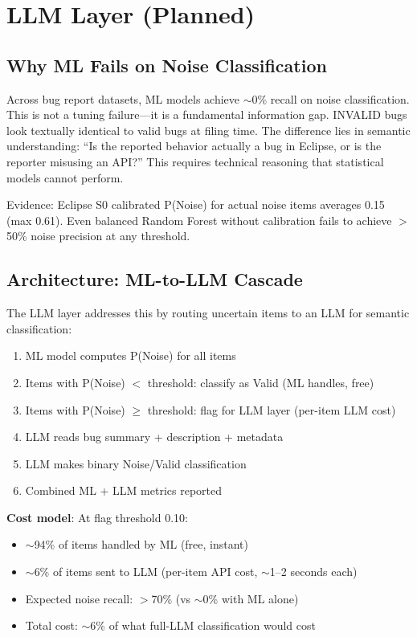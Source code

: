 \documentclass[11pt]{article}
\begin{document}
\section{LLM Layer (Planned)}
\label{sec:llm-layer}

\subsection{Why ML Fails on Noise Classification}

Across bug report datasets, ML models achieve $\sim$0\% recall on noise classification. This is not a tuning failure---it is a fundamental information gap. INVALID bugs look textually identical to valid bugs at filing time. The difference lies in semantic understanding: ``Is the reported behavior actually a bug in Eclipse, or is the reporter misusing an API?'' This requires technical reasoning that statistical models cannot perform.

Evidence: Eclipse S0 calibrated P(Noise) for actual noise items averages 0.15 (max 0.61). Even balanced Random Forest without calibration fails to achieve $>$50\% noise precision at any threshold.

\subsection{Architecture: ML-to-LLM Cascade}

The LLM layer addresses this by routing uncertain items to an LLM for semantic classification:

\begin{enumerate}
    \item ML model computes P(Noise) for all items
    \item Items with P(Noise) $<$ threshold: classify as Valid (ML handles, free)
    \item Items with P(Noise) $\geq$ threshold: flag for LLM layer (per-item LLM cost)
    \item LLM reads bug summary + description + metadata
    \item LLM makes binary Noise/Valid classification
    \item Combined ML + LLM metrics reported
\end{enumerate}

\textbf{Cost model}: At flag threshold 0.10:
\begin{itemize}
    \item $\sim$94\% of items handled by ML (free, instant)
    \item $\sim$6\% of items sent to LLM (per-item API cost, $\sim$1--2 seconds each)
    \item Expected noise recall: $>$70\% (vs $\sim$0\% with ML alone)
    \item Total cost: $\sim$6\% of what full-LLM classification would cost
\end{itemize}
\end{document}
